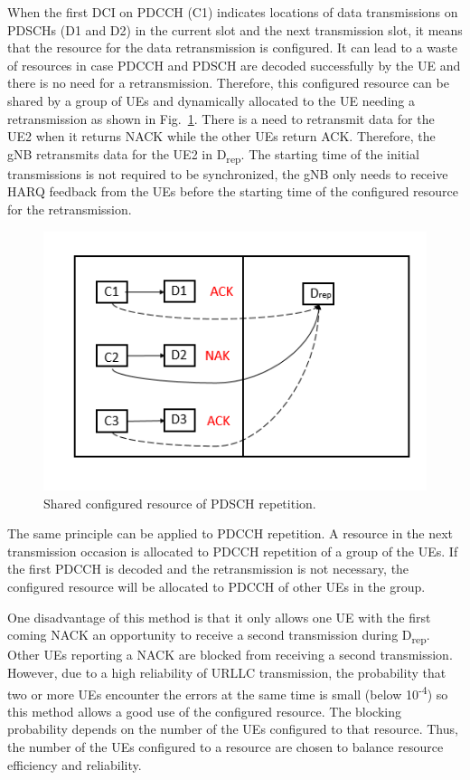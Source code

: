 \documentclass[conference,10pt]{IEEEtran}
\begin{document}
When the first DCI on PDCCH (C1) indicates locations of data transmissions on PDSCHs (D1 and D2) in the current slot and the next transmission slot, it means that the resource for the data retransmission is configured. It can lead to a waste of resources in case PDCCH and PDSCH are decoded successfully by the UE and there is no need for a retransmission. Therefore, this configured resource can be shared by a group of UEs and dynamically allocated to the UE needing a retransmission as shown in Fig.~\ref{fig2}. There is a need to retransmit data for the UE2 when it returns NACK while the other UEs return ACK. Therefore, the gNB retransmits data for the UE2 in D\textsubscript{rep}. The starting time of the initial transmissions is not required to be synchronized, the gNB only needs to receive HARQ feedback from the UEs before the starting time of the configured resource for the retransmission.

\begin{figure}[htbp]
\centerline{\includegraphics[scale=0.4]{fig2.png}}
\caption{Shared configured resource of PDSCH repetition.}
\label{fig2}
\end{figure}

The same principle can be applied to PDCCH repetition. A resource in the next transmission occasion is allocated to PDCCH repetition of a group of the UEs. If the first PDCCH is decoded and the retransmission is not necessary, the configured resource will be allocated to PDCCH of other UEs in the group.

One disadvantage of this method is that it only allows one UE with the first coming NACK an opportunity to receive a second transmission during D\textsubscript{rep}. Other UEs reporting a NACK are blocked from receiving a second transmission. However, due to a high reliability of URLLC transmission, the probability that two or more UEs encounter the errors at the same time is small (below 10\textsuperscript{-4}) so this method allows a good use of the configured resource. The blocking probability depends on the number of the UEs configured to that resource. Thus, the number of the UEs configured to a resource are chosen to balance resource efficiency and reliability.
\end{document}
